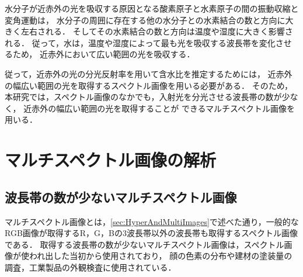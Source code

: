 水分子が近赤外の光を吸収する原因となる酸素原子と水素原子の間の振動収縮と変角運動は，
水分子の周囲に存在する他の水分子との水素結合の数と方向に大きく左右される\cite{中島2015}．
そしてその水素結合の数と方向は温度や湿度に大きく影響される\cite{角田2013}．
従って，水は，温度や湿度によって最も光を吸収する波長帯を変化させるため，
近赤外において広い範囲の光を吸収する．


従って，近赤外の光の分光反射率を用いて含水比を推定するためには，
近赤外の幅広い範囲の光を取得するスペクトル画像を用いる必要がある．
そのため，本研究では，スペクトル画像のなかでも，入射光を分光させる波長帯の数が少なく，
近赤外の幅広い範囲の光を取得することが
できるマルチスペクトル画像を用いる．

\clearpage

\section{マルチスペクトル画像の解析}
\label{sec:AnalysisOfMultispectralImage}

\subsection{波長帯の数が少ないマルチスペクトル画像}
\label{ssec:MultispectralImage}

マルチスペクトル画像とは，\ref{sec:HyperAndMultiImages}で述べた通り，一般的なRGB画像が取得するR，G，Bの3波長帯以外の波長帯も取得するスペクトル画像である．
取得する波長帯の数が少ないマルチスペクトル画像は，スペクトル画像が使われ出した当初から使用されており，
顔の色素の分布や建材の塗装量の調査，工業製品の外観検査に使用されている\cite{中野1996}\cite{長田2004}\cite{田代2013}．%

